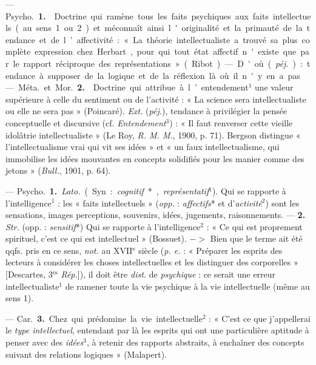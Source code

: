 \begin{itemize}[leftmargin=1cm, label=, itemsep=1pt]
 — \si{Psycho.} {\bf 1.}  Doctrine qui
ramène tous les faits psychiques aux faits intellectuels (au sens 1 ou 2) et
méconnaît ainsi l'originalité et la primauté de la tendance et de
l’affectivité : « La théorie intellectualiste a trouvé sa plus complète
expression chez Herbart, pour qui tout état affectif n'existe que par le
rapport réciproque
des représentations » (Ribot). — D'où ({\it péj.}) : tendance à supposer de
la logique et de la réflexion là où il n'y en a pas.

— \si{Méta.} et \si{Mor.} {\bf 2.}  Doctrine qui attribue à
l’entendement$^1$ une valeur supérieure à celle du sentiment ou de
l’activité : « La science sera intellectualiste ou elle ne sera
pas » (Poincaré). {\it Ext.} ({\it péj.}), tendance à privilégier la pensée
conceptuelle et discursive (cf. {\it Entendement}$^3$) : « Il faut renverser
cette vieille idolâtrie intellectualiste » (Le Roy, {\it R. M. M.}, 1900, p.
71). Bergson distingue « l’intellectualisme vrai qui vit ses idées » et « un
faux intellectualisme, qui immobilise les idées mouvantes en concepts
solidifiés pour les manier comme des jetons » ({\it Bull.}, 1901, p. 64).

 — \si{Psycho.} {\bf 1.} {\it Lato.} (Syn. :
{\it cognitif}*, {\it représentatif}$^1$). Qui se rapporte à
l'intelligence$^1$ : les « faits intellectuels » ({\it opp.} :
{\it affectifs}* et d'{\it activité}$^2$) sont les sensations, images
perceptions, souvenirs, idées, jugements, raisonnements. — {\bf 2.}
{\it Str.} (opp. : {\it sensitif}*) Qui se rapporte à l'intelligence$^2$ :
« Ce qui est proprement spirituel, c’est ce qui est intellectuel » (Bossuet).
$->$ Bien que le terme ait été qqfs. pris en ce sens, {\it not.} au
{\footnotesize XVII}$^\text{e}$ siècle ({\it p. e.} : « Préparer les esprits
des lecteurs à considérer les choses intellectuelles et les distinguer des
corporelles » [Descartes, 3$^\text{es}$ {\it Rép.}]), il doit être
{\it dist.} de {\it psychique} : ce serait une erreur intellectualiste$^1$ de
ramener toute la vie psychique à la vie intellectuelle (même au sens 1).

— \si{Car.} {\bf 3.} Chez qui prédomine la vie intellectuelle$^2$ : « C'est
ce que j'appellerai le {\it type intellectuel}, entendant par là les esprits
qui ont une particulière aptitude à penser avec des
{\it idées}$^3$, à retenir des rapports abstraits, à enchaîner des concepts
suivant des relations logiques » (Malapert).


\end{itemize}
